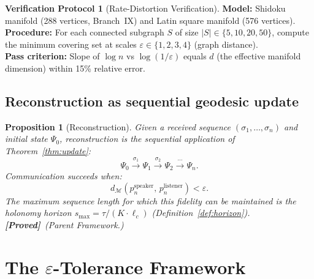 \documentclass[11pt,a4paper]{article}
\newtheorem{proposition}[theorem]{Proposition}
\theoremstyle{definition}
\newtheorem{protocol}[theorem]{Verification Protocol}
\theoremstyle{remark}
\newcommand{\statusproved}{\textcolor{green!50!black}{\textbf{[Proved]}}}
\begin{document}
\begin{protocol}[Rate-Distortion Verification]\label{prot:rate_distortion}
\textbf{Model:} Shidoku manifold (288 vertices, Branch~IX) and 
Latin square manifold (576 vertices). \\
\textbf{Procedure:} For each connected subgraph $S$ of size 
$|S| \in \{5, 10, 20, 50\}$, compute the minimum covering set 
at scales $\varepsilon \in \{1, 2, 3, 4\}$ (graph distance). \\
\textbf{Pass criterion:} Slope of $\log n$ vs $\log(1/\varepsilon)$ 
equals $d$ (the effective manifold dimension) within 15\% 
relative error.
\end{protocol}

\subsection{Reconstruction as sequential geodesic update}%
\label{sec:reconstruction}

\begin{proposition}[Reconstruction]\label{prop:reconstruction}
Given a received sequence $(\sigma_1, \ldots, \sigma_n)$ and 
initial state $\Psi_0$, reconstruction is the sequential application 
of Theorem~\ref{thm:update}:
\begin{equation}\label{eq:reconstruction}
    \Psi_0 \xrightarrow{\sigma_1} \Psi_1 \xrightarrow{\sigma_2} 
    \Psi_2 \xrightarrow{\;\cdots\;} \Psi_n.
\end{equation}
Communication succeeds when:
\begin{equation}\label{eq:fidelity}
    d_{\mathcal{M}}(p_n^{\text{speaker}},\, 
    p_n^{\text{listener}}) < \varepsilon.
\end{equation}
The maximum sequence length for which this fidelity can be 
maintained is the holonomy horizon 
$s_{\max} = \tau / (K \cdot \ell_c)$ 
(Definition~\ref{def:horizon}). \statusproved\ (Parent Framework.)
\end{proposition}


\section{The $\varepsilon$-Tolerance Framework}\label{sec:tolerance}
\end{document}
